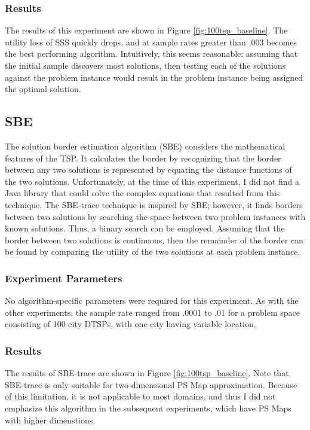 \subsubsection{Results} The results of this experiment are shown in Figure \ref{fig:100tsp_baseline}.  The utility loss of SSS quickly drops, and at sample rates greater than .003 becomes the best performing algorithm.  Intuitively, this seems reasonable:  assuming that the initial sample discovers most solutions, then testing each of the solutions against the problem instance would result in the problem instance being assigned the optimal solution.


\subsection{SBE} 

The solution border estimation algorithm (SBE) considers the mathematical features of the TSP.  It calculates the border by recognizing that the border between any two solutions is represented by equating the distance functions of the two solutions.  Unfortunately, at the time of this experiment, I did not find a Java library that could solve the complex equations that resulted from this technique.  The SBE-trace technique is inspired by SBE; however, it finds borders between two solutions by searching the space between two problem instances with known solutions.  Thus, a binary search can be employed.  Assuming that the border between two solutions is continuous, then the remainder of the border can be found by comparing the utility of the two solutions at each problem instance. 

\subsubsection{Experiment Parameters}  

No algorithm-specific parameters were required for this experiment.  As with the other experiments, the sample rate ranged from .0001 to .01 for a problem space consisting of 100-city DTSPs, with one city having variable location.

\subsubsection{Results}  The results of SBE-trace are shown in Figure \ref{fig:100tsp_baseline}.  Note that SBE-trace is only suitable for two-dimensional PS Map approximation.  Because of this limitation, it is not applicable to most domains, and thus I did not emphasize this algorithm in the subsequent experiments, which have PS Maps with higher dimenstions.


